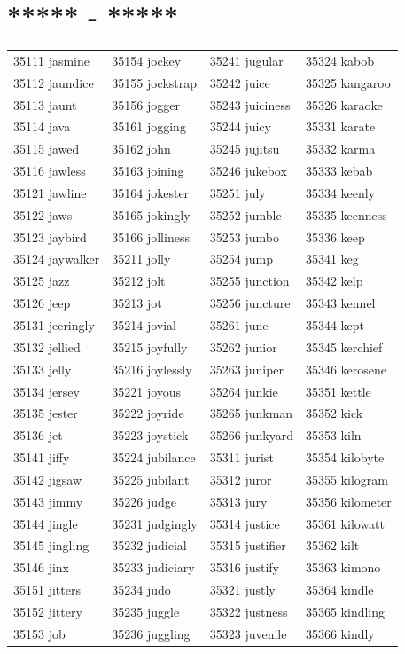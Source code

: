 \documentclass[10pt, oneside]{book}
\begin{document}
\begin{table}[h]
	\centering
	\section*{***** - *****}
	\begin{tabular}{l l l l}
35111 jasmine &35154 jockey &35241 jugular &35324 kabob\\
35112 jaundice &35155 jockstrap &35242 juice &35325 kangaroo\\
35113 jaunt &35156 jogger &35243 juiciness &35326 karaoke\\
35114 java &35161 jogging &35244 juicy &35331 karate\\
35115 jawed &35162 john &35245 jujitsu &35332 karma\\
35116 jawless &35163 joining &35246 jukebox &35333 kebab\\
35121 jawline &35164 jokester &35251 july &35334 keenly\\
35122 jaws &35165 jokingly &35252 jumble &35335 keenness\\
35123 jaybird &35166 jolliness &35253 jumbo &35336 keep\\
35124 jaywalker &35211 jolly &35254 jump &35341 keg\\
35125 jazz &35212 jolt &35255 junction &35342 kelp\\
35126 jeep &35213 jot &35256 juncture &35343 kennel\\
35131 jeeringly &35214 jovial &35261 june &35344 kept\\
35132 jellied &35215 joyfully &35262 junior &35345 kerchief\\
35133 jelly &35216 joylessly &35263 juniper &35346 kerosene\\
35134 jersey &35221 joyous &35264 junkie &35351 kettle\\
35135 jester &35222 joyride &35265 junkman &35352 kick\\
35136 jet &35223 joystick &35266 junkyard &35353 kiln\\
35141 jiffy &35224 jubilance &35311 jurist &35354 kilobyte\\
35142 jigsaw &35225 jubilant &35312 juror &35355 kilogram\\
35143 jimmy &35226 judge &35313 jury &35356 kilometer\\
35144 jingle &35231 judgingly &35314 justice &35361 kilowatt\\
35145 jingling &35232 judicial &35315 justifier &35362 kilt\\
35146 jinx &35233 judiciary &35316 justify &35363 kimono\\
35151 jitters &35234 judo &35321 justly &35364 kindle\\
35152 jittery &35235 juggle &35322 justness &35365 kindling\\
35153 job &35236 juggling &35323 juvenile &35366 kindly\\
	\end{tabular}
 \end{table}
\end{document}
